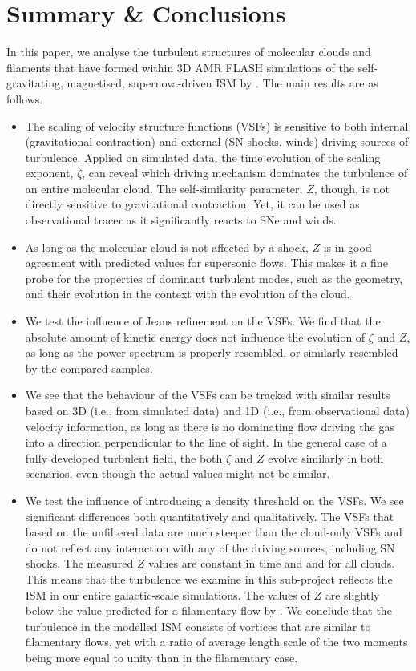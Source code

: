 \section{Summary \& Conclusions}\label{conclusions}

In this paper, we analyse the turbulent structures of molecular clouds and filaments that have formed within 3D AMR FLASH simulations of the self-gravitating, magnetised, supernova-driven ISM by \citet{IbanezMejia2016}.
The main results are as follows.

\begin{itemize}
	\item The scaling of velocity structure functions (VSFs) is sensitive to both internal (gravitational contraction) and external (SN shocks, winds) driving sources of turbulence. Applied on simulated data, the time evolution of the scaling exponent, $\zeta$, can reveal which driving mechanism dominates the turbulence of an entire molecular cloud. The self-similarity parameter, $Z$, though, is not directly sensitive to gravitational contraction. Yet, it can be used as observational tracer as it significantly reacts to SNe and winds.
	\item As long as the molecular cloud is not affected by a shock, $Z$ is in good agreement with predicted values for supersonic flows. This makes it a fine probe for the properties of dominant turbulent modes, such as the geometry, and their evolution in the context with the evolution of the cloud. 
	\item We test the influence of Jeans refinement on the VSFs. We find that the absolute amount of kinetic energy does not influence the evolution of $\zeta$ and $Z$, as long as the power spectrum is properly resembled, or similarly resembled by the compared samples.
	\item We see that the behaviour of the VSFs can be tracked with similar results based on 3D (i.e., from simulated data) and 1D (i.e., from observational data) velocity information, as long as there is no dominating flow driving the gas into a direction perpendicular to the line of sight. In the general case of a fully developed turbulent field, the both $\zeta$ and $Z$ evolve similarly in both scenarios, even though the actual values might not be similar.
	\item We test the influence of introducing a density threshold on the VSFs. We see significant differences both quantitatively and qualitatively. The VSFs that based on the unfiltered data are much steeper than the cloud-only VSFs and do not reflect any interaction with any of the driving sources, including SN shocks. The measured $Z$ values are constant in time and and for all clouds. This means that the turbulence we examine in this sub-project reflects the ISM in our entire galactic-scale simulations. The values of $Z$ are slightly below the value predicted for a filamentary flow by \citet{She1994}. We conclude that the turbulence in the modelled ISM consists of vortices that are similar to filamentary flows, yet with a ratio of average length scale of the two moments being more equal to unity than in the filamentary case.

\end{itemize}
